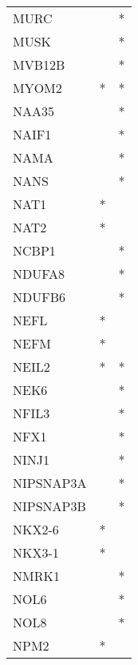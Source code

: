 \begin{longtable}{lcc}
MURC                  &                &          * \\
MUSK                  &                &          * \\
MVB12B                &                &          * \\
MYOM2                 &              * &          * \\
NAA35                 &                &          * \\
NAIF1                 &                &          * \\
NAMA                  &                &          * \\
NANS                  &                &          * \\
NAT1                  &              * &            \\
NAT2                  &              * &            \\
NCBP1                 &                &          * \\
NDUFA8                &                &          * \\
NDUFB6                &                &          * \\
NEFL                  &              * &            \\
NEFM                  &              * &            \\
NEIL2                 &              * &          * \\
NEK6                  &                &          * \\
NFIL3                 &                &          * \\
NFX1                  &                &          * \\
NINJ1                 &                &          * \\
NIPSNAP3A             &                &          * \\
NIPSNAP3B             &                &          * \\
NKX2-6                &              * &            \\
NKX3-1                &              * &            \\
NMRK1                 &                &          * \\
NOL6                  &                &          * \\
NOL8                  &                &          * \\
NPM2                  &              * &            \\

\end{longtable}
